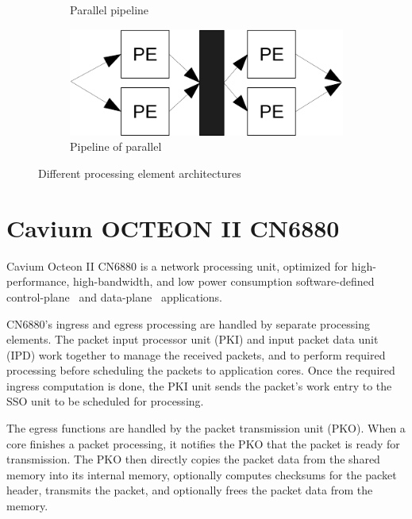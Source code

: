 \begin{figure}
\begin{subfigure}[b]{0.475\textwidth}
    \caption[]%
    {{\small Parallel pipeline}}
    \label{fig:parallel-pipeline}
  \end{subfigure}
  \begin{subfigure}[b]{0.475\textwidth}
    \centering
    \includegraphics[]{images/pipeline-parallel.pdf}
    \caption[]%
    {{\small Pipeline of parallel}}
    \label{fig:pipeline-parallel}
  \end{subfigure}
  \caption[]
  {\small Different processing element architectures}
  \label{fig:mean and std of nets}
\end{figure}

\section{Cavium OCTEON II CN6880}
\label{sec:cavium-octeon}
Cavium Octeon II CN6880 is a network processing unit, optimized for high-performance, high-bandwidth, and low power consumption software-defined control-plane~\cite{control-plane} and data-plane~\cite{data-plane} applications.

CN6880's ingress and egress processing are handled by separate processing elements. The packet input processor unit (PKI) and input packet data unit (IPD) work together to manage the received packets, and to perform required processing before scheduling the packets to application cores. Once the required ingress computation is done, the PKI unit sends the packet's work entry to the SSO unit to be scheduled for processing.~\cite{cavium:2010:fundamentals}

The egress functions are handled by the packet transmission unit (PKO). When a core finishes a packet processing, it notifies the PKO that the packet is ready for transmission. The PKO then directly copies the packet data from the shared memory into its internal memory, optionally computes checksums for the packet header, transmits the packet, and optionally frees the packet data from the memory.~\cite{cavium:2010:fundamentals}

